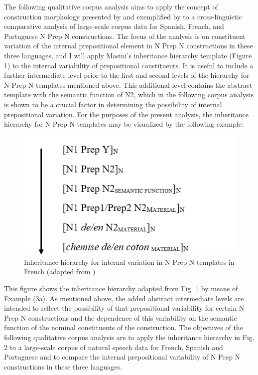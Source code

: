 \documentclass[output=paper]{langsci/langscibook}
\begin{document}
The following qualitative corpus analysis aims to apply the concept of construction morphology presented by \citet{Booij:2010,Booij:2015} and exemplified by \citet{Masini:2009} to a cross-linguistic comparative analysis of large-scale corpus data for Spanish, French, and Portuguese N Prep N constructions. The focus of the analysis is on constituent variation of the internal prepositional element in N Prep N constructions in these three languages, and I will apply Masini's inheritance hierarchy template (Figure 1) to the internal variability of prepositional constituents. It is useful to include a further intermediate level prior to the first and second levels of the hierarchy for N Prep N templates mentioned above. This additional level contains the abstract template with the semantic function of N2, which in the following corpus analysis is shown to be a crucial factor in determining the possibility of internal prepositional variation. For the purposes of the present analysis, the inheritance hierarchy for N Prep N templates may be visualized by the following example:\\

\begin{figure}
\caption{Inheritance hierarchy for internal variation in N Prep N templates in French (adapted from \citet{Masini:2009})}
\includegraphics[scale=0.5]{figures/Inheritancehierarchy.png} 
\end{figure}

This figure shows the inheritance hierarchy adapted from Fig. 1 by means of Example (3a). As mentioned above, the added abstract intermediate levels are intended to reflect the possibility of that prepositional variability for certain N Prep N constructions and the dependence of this variability on the semantic function of the nominal constituents of the construction. The objectives of the following qualitative corpus analysis are to apply the inheritance hierarchy in Fig. 2 to a large-scale corpus of natural speech data for French, Spanish and Portuguese and to compare the internal prepositional variability of N Prep N constructions in these three languages.
\end{document}
